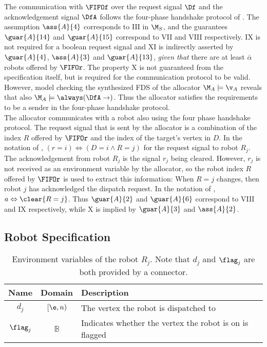 The communication with $\FIFOf$ over the request signal $\Df$ and the acknowledgement signal $\DfA$ follows the four-phase handshake protocol of . The assumption $\ass{A}{4}$ corresponds to III in $\M_S$, and the guarantees $\guar{A}{14}$ and $\guar{A}{15}$ correspond to VII and VIII respectively. IX is not required for a boolean request signal and XI is indirectly asserted by $\guar{A}{4}$, $\ass{A}{3}$ and $\guar{A}{13}$, \emph{given that} there are at least $\bar{\alpha}$ robots offered by $\FIFOr$. The property X is not guaranteed from the specification itself, but is required for the communication protocol to be valid. However, model checking the synthesized FDS of the allocator $\M_A \models \v_A$ reveals that also $\M_A \models \always(\DfA \rightarrow \next\Df)$. Thus the allocator satisfies the requirements to be a sender in the four-phase handshake protocol.\\

The allocator communicates with a robot also using the four phase handshake protocol. The request signal that is sent by the allocator is a combination of the index $R$ offered by $\FIFOr$ and the index of the target's vertex in $D$. In the notation of , $(r = i) \Leftrightarrow (D = i \wedge R = j)$ for the request signal to robot $R_j$. The acknowledgement from robot $R_j$ is the signal $r_j$ being cleared. However, $r_j$ is not received as an environment variable by the allocator, so the robot index $R$ offered by $\FIFOr$ is used to extract this information: When $R = j$ changes, then robot $j$ has acknowledged the dispatch request. In the notation of , $a \Leftrightarrow \clear{R = j}$. Thus $\guar{A}{2}$ and $\guar{A}{6}$ correspond to VIII and IX respectively, while X is implied by $\guar{A}{3}$ and $\ass{A}{2}$.\\


\subsection{Robot Specification}

\begin{table}
\centering
\begin{tabular}{c|c|l}
\hline
Name & Domain & Description \\
\hline
$d_j$ & $[\e, n)$ & The vertex the robot is dispatched to \\
$\flag_j$ & $\mathbb{B}$ & Indicates whether the vertex the robot is on is flagged \\
\hline
\end{tabular}
\caption{Environment variables of the robot $R_j$. Note that $d_j$ and $\flag_j$ are both provided by a connector.}
\label{tab:env:robot}
\end{table}

